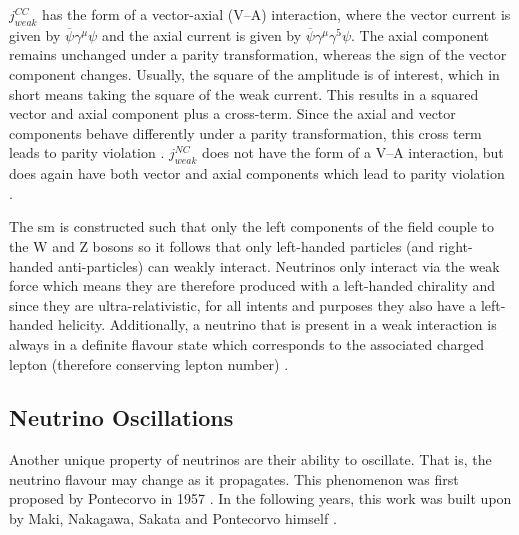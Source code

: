 $j^{CC}_{weak}$ has the form of a vector-axial (V--A) interaction, where the vector current is given by $\overline{\psi}\gamma^\mu\psi$ and the axial current is given by $\overline{\psi}\gamma^\mu\gamma^5\psi$. The axial component remains unchanged under a parity transformation, whereas the sign of the vector component changes. Usually, the square of the amplitude is of interest, which in short means taking the square of the weak current. This results in a squared vector and axial component plus a cross-term. Since the axial and vector components behave differently under a parity transformation, this cross term leads to parity violation \cite{Particles_and_Fundamental_Interactions:_An_Introduction_to_Particle_Physics} \cite{Fundamentals_of_Neutrino_Physics_and_Astrophysics}. $j^{NC}_{weak}$ does not have the form of a V--A interaction, but does again have both vector and axial components which lead to parity violation \cite{Particles_and_Fundamental_Interactions:_An_Introduction_to_Particle_Physics}.

The \gls{sm} is constructed such that only the left components of the field couple to the W and Z bosons so it follows that only left-handed particles (and right-handed anti-particles) can weakly interact. Neutrinos only interact via the weak force which means they are therefore produced with a left-handed chirality and since they are ultra-relativistic, for all intents and purposes they also have a left-handed helicity. Additionally, a neutrino that is present in a weak interaction is always in a definite flavour state which corresponds to the associated charged lepton (therefore conserving lepton number) \cite{Quarks_and_Leptons:_An_Introductor_Course_in_Modern_Particle_Physics_book}. 

\subsection{Neutrino Oscillations}\label{subsec:Neutrino Oscillations}
Another unique property of neutrinos are their ability to oscillate. That is, the neutrino flavour may change as it propagates. This phenomenon was first proposed by Pontecorvo in 1957 \cite{Pontecorvo}. In the following years, this work was built upon by Maki, Nakagawa, Sakata and Pontecorvo himself \cite{MNS_oscillations}. 

